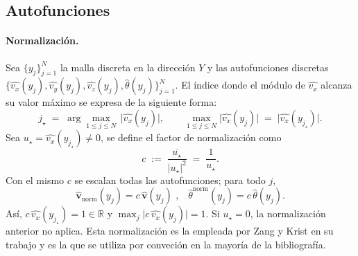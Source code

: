\subsection{Autofunciones}

\paragraph{Normalización.}
Sea $\{y_j\}_{j=1}^{N}$ la malla discreta en la dirección $Y$ y las autofunciones discretas
$\{\widehat{v_x}(y_j),\widehat{v_y}(y_j),\widehat{v_z}(y_j),\widehat{\theta}(y_j)\}_{j=1}^{N}$. El índice donde el módulo de $\widehat{v_x}$ alcanza su valor máximo se expresa de la siguiente forma:
$$
j_\star \;=\; \arg\max_{1\le j\le N}\,\big|\widehat{v_x}(y_j)\big|, 
\qquad 
\max_{1\le j\le N}\big|\widehat{v_x}(y_j)\big| \;=\; \big|\widehat{v_x}(y_{j_\star})\big|.
$$
Sea $u_\star=\widehat{v_x}(y_{j_\star})\neq 0$, se define el factor de normalización como
$$
c \;:=\; \frac{\overline{u_\star}}{|u_\star|^2} \;=\; \frac{1}{u_\star}.
$$
Con el mismo $c$ se escalan todas las autofunciones; para todo $j$,
$$
\boldsymbol{\widehat{v}}_{\mathrm{norm}}(y_j)=c\,\boldsymbol{\widehat{v}}(y_j) \text{ ,} \quad
\widehat{\theta}^{\mathrm{norm}}(y_j)=c\,\widehat{\theta}(y_j).
$$
Así, $c\,\widehat{v_x}(y_{j_\star})=1\in\mathbb{R}$ y $\max_j\big|c\,\widehat{v_x}(y_j)\big|=1$. Si $u_\star=0$, la normalización anterior no aplica. Esta normalización es la empleada por Zang y Krist en su trabajo \cite{zang1989numerical} y es la que se utiliza por conveción en la mayoría de la bibliografía.




